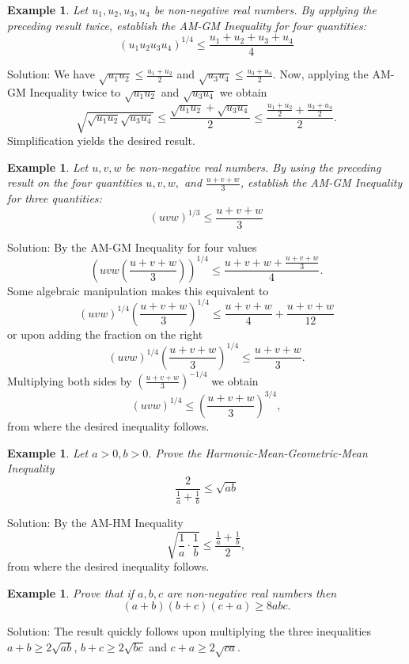 \documentclass[11pt, openany]{book}
\theoremstyle{change} \theoremheaderfont{\blue\sffamily\bfseries}
\newtheorem{exa}[thm]{Example}
\theoremstyle{nonumberplain} \theoremheaderfont{\sffamily\bfseries}
\newcommand{\dis}{\displaystyle}
\newcommand{\í}{\'{\i}}
\begin{document}
\begin{exa}
Let $u_1, u_2, u_3, u_4$ be non-negative real numbers. By applying
the preceding result twice, establish the AM-GM Inequality for
four quantities:
\begin{equation}
(u_1u_2u_3u_4)^{1/4} \leq \frac{u_1 + u_2 + u_3 + u_4}{4}
\end{equation}
\end{exa}
Solution: We have $\sqrt{u_1u_2} \leq \frac{u_1 + u_2}{2}$ and
$\sqrt{u_3u_4} \leq \frac{u_3 + u_4}{2}$. Now, applying the AM-GM
Inequality twice to $\sqrt{u_1u_2}$ and $\sqrt{u_3u_4}$ we obtain
$$\sqrt{\sqrt{u_1u_2}\sqrt{u_3u_4}} \leq \frac{\sqrt{u_1u_2} + \sqrt{u_3u_4}}{2} \leq
\frac{\frac{u_1 + u_2}{2} + \frac{u_3 + u_4}{2}
}{2}.$$Simplification yields the desired result.
\begin{exa}
Let $u, v, w$ be non-negative real numbers. By using the preceding
result on the four quantities $u, v, w,$ and $\frac{u + v +
w}{3}$, establish the AM-GM Inequality for three quantities:
\begin{equation}
(uvw)^{1/3} \leq \frac{u + v + w}{3} \end{equation}
\end{exa}
Solution: By the AM-GM Inequality for four values
$$\left(uvw\left(\frac{u + v + w}{3}\right)\right)^{1/4} \leq \frac{u + v + w + \frac{u + v + w}{3}}{4}.$$Some algebraic
manipulation makes this equivalent to
$$(uvw)^{1/4}\left(\frac{u + v + w}{3}\right)^{1/4} \leq \frac{u + v + w}{4} + \frac{u + v + w}{12}$$ or
upon adding the fraction on the right
$$(uvw)^{1/4}\left(\frac{u + v + w}{3}\right)^{1/4} \leq \frac{u + v + w}{3}. $$
Multiplying both sides by $\dis{\left(\frac{u + v +
w}{3}\right)^{-1/4} }$ we obtain
$$(uvw)^{1/4} \leq \left(\frac{u + v + w}{3}\right)^{3/4},  $$from where the desired inequality
follows.
\begin{exa}
Let $a > 0, b > 0$. Prove the {\em Harmonic-Mean-Geometric-Mean}
Inequality
\begin{equation}\frac{2}{\frac{1}{a} + \frac{1}{b}} \leq \sqrt{ab} \end{equation}
\end{exa}
Solution: By the AM-HM Inequality
$$\sqrt{\frac{1}{a}\cdot\frac{1}{b}} \leq \frac{\frac{1}{a} + \frac{1}{b}}{2},$$from where
the desired inequality follows.
\begin{exa}
Prove that if $a, b, c$ are non-negative real numbers then $$(a +
b)(b + c)(c + a) \geq 8abc.$$
\end{exa}
Solution: The result quickly follows upon multiplying the three
inequalities $a + b \geq 2\sqrt{ab}$, $b + c \geq 2\sqrt{bc}$ and
$c + a \geq 2\sqrt{ca}$.
\end{document}
